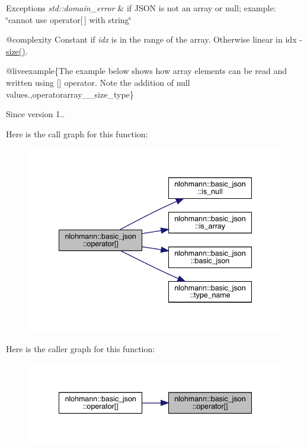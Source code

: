 \begin{DoxyExceptions}{Exceptions}
{\em std\+::domain\+\_\+error} & if J\+S\+ON is not an array or null; example\+: {\ttfamily \char`\"{}cannot use operator\mbox{[}$\,$\mbox{]} with string\char`\"{}}\\
\hline
\end{DoxyExceptions}
@complexity Constant if {\itshape idx} is in the range of the array. Otherwise linear in {\ttfamily idx -\/ \mbox{\hyperlink{classnlohmann_1_1basic__json_a25e27ad0c6d53c01871c5485e1f75b96}{size()}}}.

@liveexample\{The example below shows how array elements can be read and written using {\ttfamily \mbox{[}\mbox{]}} operator. Note the addition of {\ttfamily null} values.,operatorarray\+\_\+\+\_\+size\+\_\+type\}

\begin{DoxySince}{Since}
version 1.. 
\end{DoxySince}
Here is the call graph for this function\+:\nopagebreak
\begin{figure}[H]
\begin{center}
\leavevmode
\includegraphics[width=341pt]{classnlohmann_1_1basic__json_ac871e3b03fb2eeca9a8de4db2bea760f_cgraph}
\end{center}
\end{figure}
Here is the caller graph for this function\+:\nopagebreak
\begin{figure}[H]
\begin{center}
\leavevmode
\includegraphics[width=341pt]{classnlohmann_1_1basic__json_ac871e3b03fb2eeca9a8de4db2bea760f_icgraph}
\end{center}
\end{figure}
